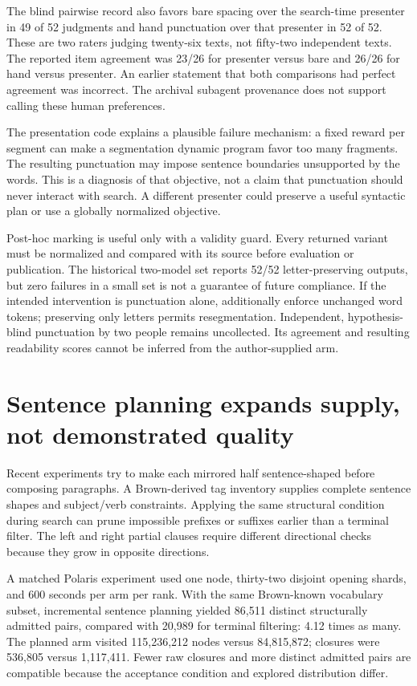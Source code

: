 \documentclass[11pt,letterpaper]{article}
\newcommand{\pageend}{\clearpage}
\begin{document}
The blind pairwise record also favors bare spacing over the search-time presenter in 49 of 52 judgments and hand punctuation over that presenter in 52 of 52. These are two raters judging twenty-six texts, not fifty-two independent texts. The reported item agreement was 23/26 for presenter versus bare and 26/26 for hand versus presenter. An earlier statement that both comparisons had perfect agreement was incorrect. The archival subagent provenance does not support calling these human preferences.

The presentation code explains a plausible failure mechanism: a fixed reward per segment can make a segmentation dynamic program favor too many fragments. The resulting punctuation may impose sentence boundaries unsupported by the words. This is a diagnosis of that objective, not a claim that punctuation should never interact with search. A different presenter could preserve a useful syntactic plan or use a globally normalized objective.

Post-hoc marking is useful only with a validity guard. Every returned variant must be normalized and compared with its source before evaluation or publication. The historical two-model set reports 52/52 letter-preserving outputs, but zero failures in a small set is not a guarantee of future compliance. If the intended intervention is punctuation alone, additionally enforce unchanged word tokens; preserving only letters permits resegmentation. Independent, hypothesis-blind punctuation by two people remains uncollected. Its agreement and resulting readability scores cannot be inferred from the author-supplied arm.
\pageend

\section{Sentence planning expands supply, not demonstrated quality}
\label{sec:plans}
Recent experiments try to make each mirrored half sentence-shaped before composing paragraphs. A Brown-derived tag inventory supplies complete sentence shapes and subject/verb constraints. Applying the same structural condition during search can prune impossible prefixes or suffixes earlier than a terminal filter. The left and right partial clauses require different directional checks because they grow in opposite directions.

A matched Polaris experiment used one node, thirty-two disjoint opening shards, and 600 seconds per arm per rank. With the same Brown-known vocabulary subset, incremental sentence planning yielded 86,511 distinct structurally admitted pairs, compared with 20,989 for terminal filtering: 4.12 times as many. The planned arm visited 115,236,212 nodes versus 84,815,872; closures were 536,805 versus 1,117,411. Fewer raw closures and more distinct admitted pairs are compatible because the acceptance condition and explored distribution differ.
\end{document}
